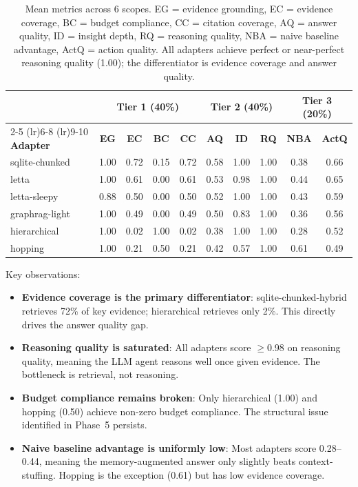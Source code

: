 \documentclass[11pt,letterpaper]{article}
\begin{document}
\begin{table}[H]
\centering
\small
\begin{tabular}{lccccccccc}
\toprule
& \multicolumn{4}{c}{\textbf{Tier 1 (40\%)}} & \multicolumn{3}{c}{\textbf{Tier 2 (40\%)}} & \multicolumn{2}{c}{\textbf{Tier 3 (20\%)}} \\
\cmidrule(lr){2-5} \cmidrule(lr){6-8} \cmidrule(lr){9-10}
\textbf{Adapter} & \textbf{EG} & \textbf{EC} & \textbf{BC} & \textbf{CC} & \textbf{AQ} & \textbf{ID} & \textbf{RQ} & \textbf{NBA} & \textbf{ActQ} \\
\midrule
sqlite-chunked & 1.00 & 0.72 & 0.15 & 0.72 & 0.58 & 1.00 & 1.00 & 0.38 & 0.66 \\
letta & 1.00 & 0.61 & 0.00 & 0.61 & 0.53 & 0.98 & 1.00 & 0.44 & 0.65 \\
letta-sleepy & 0.88 & 0.50 & 0.00 & 0.50 & 0.52 & 1.00 & 1.00 & 0.43 & 0.59 \\
graphrag-light & 1.00 & 0.49 & 0.00 & 0.49 & 0.50 & 0.83 & 1.00 & 0.36 & 0.56 \\
hierarchical & 1.00 & 0.02 & 1.00 & 0.02 & 0.38 & 1.00 & 1.00 & 0.28 & 0.52 \\
hopping & 1.00 & 0.21 & 0.50 & 0.21 & 0.42 & 0.57 & 1.00 & 0.61 & 0.49 \\
\bottomrule
\end{tabular}
\caption{Mean metrics across 6 scopes. EG = evidence grounding, EC = evidence coverage, BC = budget compliance, CC = citation coverage, AQ = answer quality, ID = insight depth, RQ = reasoning quality, NBA = naive baseline advantage, ActQ = action quality. All adapters achieve perfect or near-perfect reasoning quality (1.00); the differentiator is evidence coverage and answer quality.}
\label{tab:metrics}
\end{table}

Key observations:
\begin{itemize}[nosep]
  \item \textbf{Evidence coverage is the primary differentiator}: sqlite-chunked-hybrid retrieves 72\% of key evidence; hierarchical retrieves only 2\%. This directly drives the answer quality gap.
  \item \textbf{Reasoning quality is saturated}: All adapters score $\geq$0.98 on reasoning quality, meaning the LLM agent reasons well once given evidence. The bottleneck is retrieval, not reasoning.
  \item \textbf{Budget compliance remains broken}: Only hierarchical (1.00) and hopping (0.50) achieve non-zero budget compliance. The structural issue identified in Phase~5 persists.
  \item \textbf{Naive baseline advantage is uniformly low}: Most adapters score 0.28--0.44, meaning the memory-augmented answer only slightly beats context-stuffing. Hopping is the exception (0.61) but has low evidence coverage.
\end{itemize}
\end{document}
